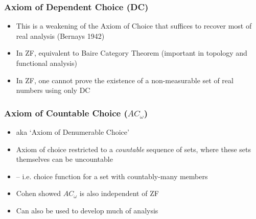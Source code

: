 \begin{frame}
\frametitle{Axiom of Dependent Choice (DC)}

\begin{itemize}[<+->]

\item This is a weakening of the Axiom of Choice that suffices to recover most of real analysis (Bernays 1942)

\item In ZF, equivalent to Baire Category Theorem (important in topology and functional analysis)


\item In ZF, one cannot prove the existence of a non-measurable set of real numbers using only DC


\end{itemize}
\end{frame}

\begin{frame}
\frametitle{Axiom of Countable Choice ($AC_{\omega}$)}

\begin{itemize}[<+->]

\item aka `Axiom of Denumerable Choice' 

\item Axiom of choice restricted to a \textit{countable} sequence of sets, where these sets themselves can be uncountable 

\item[] -- i.e. choice function for a set with countably-many members

\item Cohen showed $AC_{\omega}$ is also independent of ZF 

\item Can also be used to develop much of analysis 



\end{itemize}
\end{frame}


